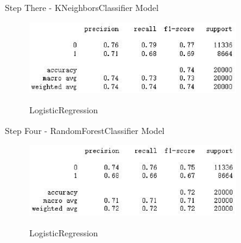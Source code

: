 \documentclass[
size=14pt,
paper=smartboard,  %
mode=present, 		%
display=slides, 	%
style=tuliplab,  	%
pauseslide,
fleqn,leqno]{powerdot}
\begin{document}
	
	\begin{slide}[toc=,bm=]{Step There - KNeighborsClassifier Model}
		\begin{figure}
			\centering
			\includegraphics[width=0.8\textwidth]{figures//fig9.eps}\\
			\caption{LogisticRegression}
		\end{figure}
	\end{slide}
	
	
	\begin{slide}[toc=,bm=]{Step Four - RandomForestClassifier Model}
		\begin{figure}
			\centering
			\includegraphics[width=0.8\textwidth]{figures//fig10.eps}\\
			\caption{LogisticRegression}
		\end{figure}
	\end{slide}
	
\end{document}
